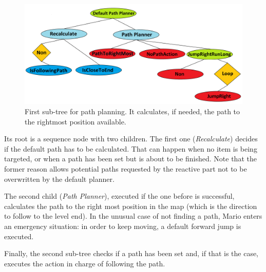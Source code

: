 \documentclass[conference]{IEEEtran}
\begin{document}
\begin{figure} [ht]
	\begin{center}
	\includegraphics[scale=0.075]{images/lastButOne2}
	\caption{First sub-tree for path planning. It calculates, if needed, the path
	to the rightmost position available.}
	\label{fig:lastButOne}
	\end{center}
\end{figure}

Its root is a sequence node with two children. 
The first one (\textit{Recalculate}) decides if the default path 
has to be calculated. That can happen when no item is being targeted,
or when a path has been set but is about to be finished. Note that the former
reason allows potential paths requested by the reactive part not 
to be overwritten by the default planner. 

The second child (\textit{Path Planner}), executed if the one before 
is successful, calculates the path to the right most position in the 
map (which is the direction to follow to the level end). In the unusual 
case of not finding a path, Mario enters an emergency situation: in order 
to keep moving, a default forward jump is executed.

Finally, the second sub-tree checks if a path
has been set and, if that is the case, executes the action in charge of following the path.


\end{document}
